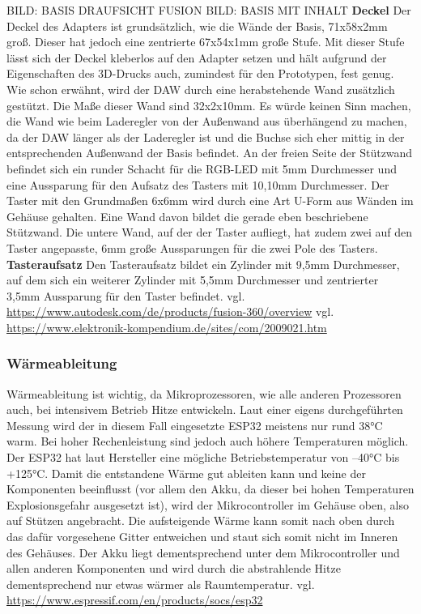 \documentclass[]{article}
\begin{document}
BILD: BASIS DRAUFSICHT FUSION\newline
BILD: BASIS MIT INHALT
\vspace{4mm}\newline
\textbf{Deckel} \newline
Der Deckel des Adapters ist grundsätzlich, wie die Wände der Basis, 71x58x2mm groß. Dieser hat jedoch eine zentrierte 67x54x1mm große Stufe. Mit dieser Stufe lässt sich der Deckel kleberlos auf den Adapter setzen und hält aufgrund der Eigenschaften des 3D-Drucks auch, zumindest für den Prototypen, fest genug.
Wie schon erwähnt, wird der DAW durch eine herabstehende Wand zusätzlich gestützt. Die Maße dieser Wand sind 32x2x10mm. Es würde keinen Sinn machen, die Wand wie beim Laderegler von der Außenwand aus überhängend zu machen, da der DAW länger als der Laderegler ist und die Buchse sich eher mittig in der entsprechenden Außenwand der Basis befindet.\newline
An der freien Seite der Stützwand befindet sich ein runder Schacht für die RGB-LED mit 5mm Durchmesser und eine Aussparung für den Aufsatz des Tasters mit 10,10mm Durchmesser. Der Taster mit den Grundmaßen 6x6mm wird durch eine Art U-Form aus Wänden im Gehäuse gehalten. Eine Wand davon bildet die gerade eben beschriebene Stützwand. Die untere Wand, auf der der Taster aufliegt, hat zudem zwei auf den Taster angepasste, 6mm große Aussparungen für die zwei Pole des Tasters.
\vspace{4mm}\newline
\textbf{Tasteraufsatz} \newline
Den Tasteraufsatz bildet ein Zylinder mit 9,5mm Durchmesser, auf dem sich ein weiterer Zylinder mit 5,5mm Durchmesser und zentrierter 3,5mm Aussparung für den Taster befindet.
\vspace{4mm}\newline
vgl. \url{https://www.autodesk.com/de/products/fusion-360/overview}\newline
vgl. \url{https://www.elektronik-kompendium.de/sites/com/2009021.htm}
\subsubsection{Wärmeableitung}
Wärmeableitung ist wichtig, da Mikroprozessoren, wie alle anderen Prozessoren auch, bei intensivem Betrieb Hitze entwickeln. Laut einer eigens durchgeführten Messung wird der in diesem Fall eingesetzte ESP32 meistens nur rund 38°C warm. Bei hoher Rechenleistung sind jedoch auch höhere Temperaturen möglich. Der ESP32 hat laut Hersteller eine mögliche Betriebstemperatur von –40°C bis +125°C. Damit die entstandene Wärme gut ableiten kann und keine der Komponenten beeinflusst (vor allem den Akku, da dieser bei hohen Temperaturen Explosionsgefahr ausgesetzt ist), wird der Mikrocontroller im Gehäuse oben, also auf Stützen angebracht. Die aufsteigende Wärme kann somit nach oben durch das dafür vorgesehene Gitter entweichen und staut sich somit nicht im Inneren des Gehäuses. Der Akku liegt dementsprechend unter dem Mikrocontroller und allen anderen Komponenten und wird durch die abstrahlende Hitze dementsprechend nur etwas wärmer als Raumtemperatur.
\vspace{4mm}\newline
vgl. \url{https://www.espressif.com/en/products/socs/esp32}
\end{document}
